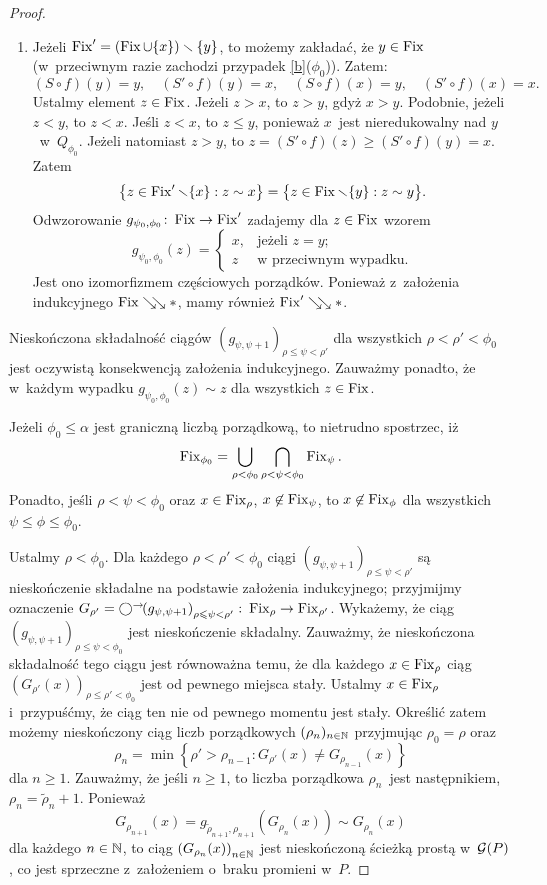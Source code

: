 \begin{proof}
\begin{enumerate}[I($\phi_0$).]
\item\label{d} Jeżeli $\operatorname{Fix}'=(\operatorname{Fix}\cup\{x\})\smallsetminus\{y\}$, to możemy zakładać, że $y\in \operatorname{Fix}$ (w~przeciwnym razie zachodzi przypadek \ref{b}($\phi_0$)). Zatem: \[(S\circ f)(y)=y,\quad (S'\circ f)(y)=x,\quad (S\circ f)(x)=y,\quad (S'\circ f)(x)=x.\] Ustalmy element $z\in \operatorname{Fix}$. Jeżeli $z>x$, to $z>y$, gdyż $x>y$. Podobnie, jeżeli $z<y$, to $z<x$. Jeśli $z<x$, to $z\leq y$, ponieważ $x$~jest nieredukowalny nad $y$~w~$Q_{\phi_0}$. Jeżeli natomiast $z>y$, to $z=(S'\circ f)(z)\geq (S'\circ f)(y)=x$. Zatem \[\left\{z\in \operatorname{Fix}'\smallsetminus\{x\}:z\sim x\right\}=\bigl\{z\in \operatorname{Fix}\smallsetminus\{y\}:z\sim y\bigr\}.\] Odwzorowanie $g_{\psi_0,\phi_0}\colon \operatorname{Fix}\to \operatorname{Fix}'$ zadajemy dla $z\in \operatorname{Fix}$ wzorem \[g_{\psi_0,\phi_0}(z)=\begin{cases}x, &\text{jeżeli } z=y;\\
z & \text{w przeciwnym wypadku.}
\end{cases}\]
Jest ono izomorfizmem częściowych porządków. Ponieważ z~założenia indukcyjnego $\operatorname{Fix}\searrow\!\!\searrow *$, mamy również $\operatorname{Fix}'\searrow\!\!\searrow *$. 
\end{enumerate}
Nieskończona składalność ciągów $\left(g_{\psi,\psi+1}\right)_{\rho\leq\psi<\rho'}$ dla wszystkich $\rho<\rho'<\phi_0$ jest oczywistą konsekwencją założenia indukcyjnego. Zauważmy ponadto, że w~każdym wypadku $g_{\psi_0,\phi_0}(z)\sim z$ dla wszystkich $z\in\operatorname{Fix}$.

Jeżeli $\phi_0\leq\alpha$ jest graniczną liczbą porządkową, to nietrudno spostrzec, iż \[\operatorname{Fix}_{\phi_0}=\bigcup_{\rho<\phi_0}\bigcap_{\rho<\psi<\phi_0}\operatorname{Fix}_{\psi}.\] Ponadto, jeśli $\rho<\psi<\phi_0$ oraz $x\in \operatorname{Fix}_{\rho}$, $x\not\in \operatorname{Fix}_{\psi}$, to $x\not\in \operatorname{Fix}_{\phi}$ dla wszystkich $\psi\leq \phi\leq \phi_0$.

Ustalmy $\rho<\phi_0$. Dla każdego $\rho<\rho'<\phi_0$ ciągi $\left(g_{\psi,\psi+1}\right)_{\rho\leq \psi<\rho'}$ są nieskończenie składalne na podstawie założenia indukcyjnego; przyjmijmy oznaczenie $G_{\rho'}=\bigcirc^\rightarrow\!\! \left(g_{\psi,\psi+1}\right)_{\rho\leqslant \psi<\rho'} \colon \operatorname{Fix}_{\rho}\to \operatorname{Fix}_{\rho'}$. Wykażemy, że ciąg $\left(g_{\psi,\psi+1}\right)_{\rho\leq \psi<\phi_0}$ jest nieskończenie składalny. Zauważmy, że nieskończona składalność tego ciągu jest równoważna temu, że dla każdego $x\in \operatorname{Fix}_{\rho}$ ciąg $\left(G_{\rho'}(x)\right)_{\rho\leq \rho'<\phi_0}$ jest od pewnego miejsca stały. Ustalmy $x\in \operatorname{Fix}_{\rho}$ i~przypuśćmy, że ciąg ten nie od pewnego momentu jest stały. Określić zatem możemy nieskończony ciąg liczb porządkowych $(\rho_n)_{n\in\mathbb{N}}$ przyjmując $\rho_0=\rho$ oraz \[\rho_n=\min\left\{\rho'>\rho_{n-1}:G_{\rho'}(x)\not=G_{\rho_{n-1}}(x)\right\}\] dla $n\geq 1$. Zauważmy, że jeśli $n\geq 1$, to liczba porządkowa $\rho_n$~jest następnikiem, $\rho_n=\tilde{\rho}_n+1$. Ponieważ \[G_{\rho_{n+1}}(x)=g_{\tilde{\rho}_{n+1},\rho_{n+1}}\left(G_{\rho_n}(x)\right)\sim G_{\rho_n}(x)\] dla każdego $n\in \mathbb{N}$, to ciąg $\left(G_{\rho_n}(x)\right)_{n\in\mathbb{N}}$ jest nieskończoną ścieżką prostą w~$\mathcal{G}(P)$, co jest sprzeczne z~założeniem o~braku promieni w~$P$.


\end{proof}
